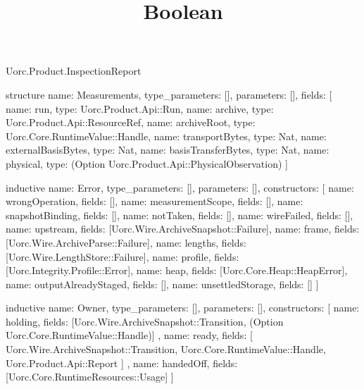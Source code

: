 \begin{lexlean}{Uorc.Product.InspectionReport}
\title{Boolean}
\begin{semanticmodule}
structure{
  name: Measurements,
  type_parameters: [],
  parameters: [],
  fields: [
    {name: run, type: Uorc.Product.Api::Run},
    {name: archive, type: Uorc.Product.Api::ResourceRef},
    {name: archiveRoot, type: Uorc.Core.RuntimeValue::Handle},
    {name: transportBytes, type: Nat},
    {name: externalBasisBytes, type: Nat},
    {name: basisTransferBytes, type: Nat},
    {name: physical, type: (Option Uorc.Product.Api::PhysicalObservation)}
  ]
}

inductive{
  name: Error,
  type_parameters: [],
  parameters: [],
  constructors: [
    {name: wrongOperation, fields: []},
    {name: measurementScope, fields: []},
    {name: snapshotBinding, fields: []},
    {name: notTaken, fields: []},
    {name: wireFailed, fields: []},
    {name: upstream, fields: [Uorc.Wire.ArchiveSnapshot::Failure]},
    {name: frame, fields: [Uorc.Wire.ArchiveParse::Failure]},
    {name: lengths, fields: [Uorc.Wire.LengthStore::Failure]},
    {name: profile, fields: [Uorc.Integrity.Profile::Error]},
    {name: heap, fields: [Uorc.Core.Heap::HeapError]},
    {name: outputAlreadyStaged, fields: []},
    {name: unsettledStorage, fields: []}
  ]
}

inductive{
  name: Owner,
  type_parameters: [],
  parameters: [],
  constructors: [
    {
      name: holding,
      fields: [Uorc.Wire.ArchiveSnapshot::Transition, (Option Uorc.Core.RuntimeValue::Handle)]
    },
    {
      name: ready,
      fields: [
        Uorc.Wire.ArchiveSnapshot::Transition,
        Uorc.Core.RuntimeValue::Handle,
        Uorc.Product.Api::Report
      ]
    },
    {name: handedOff, fields: [Uorc.Core.RuntimeResources::Usage]}
  ]
}


\end{semanticmodule}
\end{lexlean}

